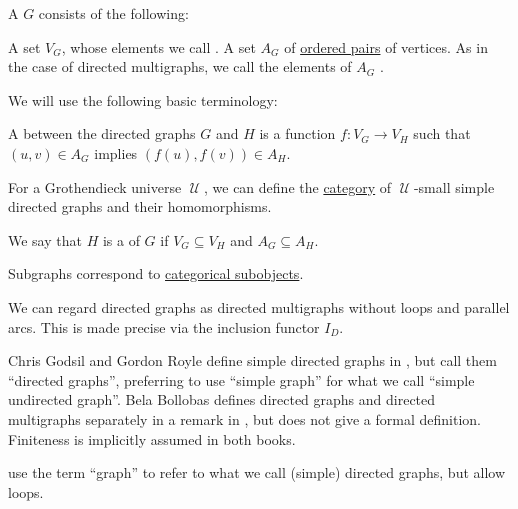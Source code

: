 \begin{definition}\label{def:directed_graph}
  A  \( G \) consists of the following:
  \begin{thmenum}[series=def:directed_graph]
     A set \( V_G \), whose elements we call .
     A set \( A_G \) of \hyperref[def:cartesian_product/kuratowski_pair]{ordered pairs} of  vertices. As in the case of directed multigraphs, we call the elements of \( A_G \) .
  \end{thmenum}

  We will use the following basic terminology:
  \begin{thmenum}[resume=def:directed_graph]
     A  between the directed graphs \( G \) and \( H \) is a function \( f: V_G \to V_H \) such that \( (u, v) \in A_G \) implies \( (f(u), f(v)) \in A_H \).

     For a Grothendieck universe \( \mscrU \), we can define the \hyperref[def:category]{category} of \( \mscrU \)-small simple directed graphs and their homomorphisms.

    \mimprovised We say that \( H \) is a  of \( G \) if \( V_G \subseteq V_H \) and \( A_G \subseteq A_H \).

    Subgraphs correspond to \hyperref[def:subobject_and_quotient]{categorical subobjects}.
  \end{thmenum}
\end{definition}
\begin{comments}
  \item We can regard directed graphs as directed multigraphs without loops and parallel arcs. This is made precise via the inclusion functor \hyperref[def:graph_functors/directed_inclusion]{\( I_D \)}.

  \item Chris Godsil and Gordon Royle define simple directed graphs in \cite[2]{GodsilRoyle2001}, but call them \enquote{directed graphs}, preferring to use \enquote{simple graph} for what we call \enquote{simple undirected graph}. Bela Bollobas defines directed graphs and directed multigraphs separately in a remark in \cite[8]{Bollobas1998}, but does not give a formal definition. Finiteness is implicitly assumed in both books.

   use the term \enquote{graph} to refer to what we call (simple) directed graphs, but allow loops.
\end{comments}

